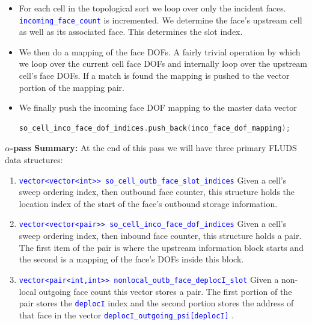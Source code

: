 \documentclass[11pt,letterpaper,titlepage]{article}
\newcommand{\xmltag}[1]{\textcolor{blue}{ \texttt{#1}} }
\numberwithin{equation}{section}
\begin{document}
\begin{itemize}
\item For each cell in the topological sort we loop over only the incident faces. \xmltag{incoming\_face\_count} is incremented. We determine the face's upstream cell as well as its associated face. This determines the slot index.
\item We then do a mapping of the face DOFs. A fairly trivial operation by which we loop over the current cell face DOFs and internally loop over the upstream cell's face DOFs. If a match is found the mapping is pushed to the vector portion of the mapping pair.
\item We finally push the incoming face DOF mapping to the master data vector
\begin{lstlisting}[language=c++]
so_cell_inco_face_dof_indices.push_back(inco_face_dof_mapping);
\end{lstlisting}
\end{itemize}

\textbf{$\alpha$-pass Summary:}\newline
At the end of this pass we will have three primary FLUDS data structures:
\begin{enumerate}
\item \xmltag{vector<vector<int>> so\_cell\_outb\_face\_slot\_indices} \newline 
Given a cell's sweep ordering index, then outbound face counter, this structure holds the location index of the start of the face's outbound storage information.
\item \xmltag{vector<vector<pair>> so\_cell\_inco\_face\_dof\_indices} \newline 
Given a cell's sweep ordering index, then inbound face counter, this structure holds a pair. The first item of the pair is where the upstream information block starts and the second is a mapping of the face's DOFs inside this block.
\item \xmltag{vector<pair<int,int>> nonlocal\_outb\_face\_deplocI\_slot} \newline 
Given a non-local outgoing face count this vector stores a pair. The first portion of the pair stores the \xmltag{deplocI} index and the second portion stores the address of that face in the vector \xmltag{deplocI\_outgoing\_psi[deplocI]}.
\end{enumerate}
\end{document}
